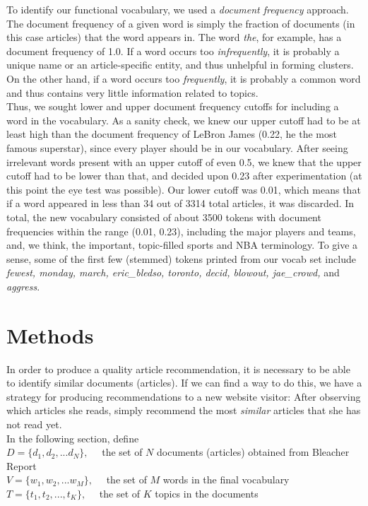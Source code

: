 \documentclass[11pt]{article}
\begin{document}
To identify our functional vocabulary, we used a \textit{document frequency} approach. The document frequency of a given word is simply the fraction of documents (in this case articles) that the word appears in. The word \textit{the}, for example, has a document frequency of 1.0. If a word occurs too \textit{infrequently}, it is probably a unique name or an article-specific entity, and thus unhelpful in forming clusters. On the other hand, if a word occurs too \textit{frequently}, it is probably a common word and thus contains very little information related to topics.  \\

Thus, we sought lower and upper document frequency cutoffs for including a word in the vocabulary.  As a sanity check, we knew our upper cutoff had to be at least high than the document frequency of LeBron James (0.22, he the most famous superstar), since every player should be in our vocabulary. After seeing irrelevant words present with an upper cutoff of even 0.5, we knew that the upper cutoff had to be lower than that, and decided upon 0.23 after experimentation (at this point the eye test was possible). Our lower cutoff was 0.01, which means that if a word appeared in less than 34 out of 3314 total articles, it was discarded.  In total, the new vocabulary consisted of about 3500 tokens with document frequencies within the range (0.01, 0.23), including the major players and teams, and, we think, the important, topic-filled sports and NBA terminology. To give a sense, some of the first few (stemmed) tokens printed from our vocab set include \textit{fewest, monday, march, eric\_bledso, toronto, decid, blowout, jae\_crowd,} and \textit{aggress}.  



\section{Methods}
In order to produce a quality article recommendation, it is necessary to be able to identify similar documents (articles).  If we can find a way to do this, we have a strategy for producing recommendations to a new website visitor: After observing which articles she reads, simply recommend the most \textit{similar} articles that she has not read yet.\\

In the following section, define \\
$D = \{d_1, d_2, ... d_N \}, \quad$ the set of $N$ documents (articles) obtained from Bleacher Report \\
$V = \{w_1, w_2, ... w_M \}, \quad$ the set of $M$ words in the final vocabulary \\
$T = \{t_1, t_2, ..., t_K\}, \quad$ the set of $K$ topics in the documents \\
\end{document}
